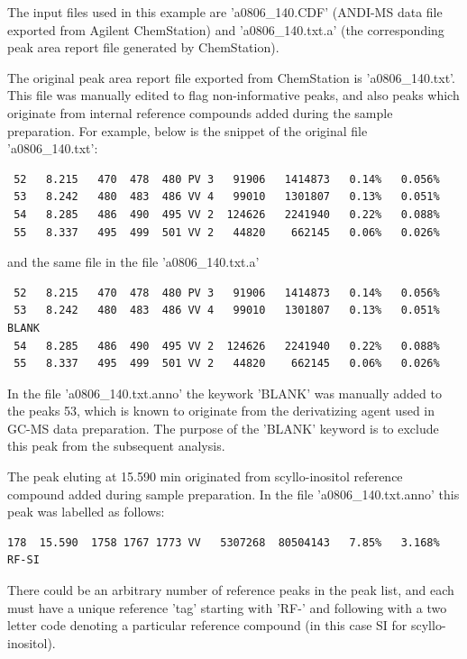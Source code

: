 The input files used in this example are 'a0806\_140.CDF' (ANDI-MS data
file exported from Agilent ChemStation) and 'a0806\_140.txt.a' (the 
corresponding peak area report file generated by ChemStation).

The original peak area report file exported from ChemStation is
'a0806\_140.txt'. This file was manually edited to flag non-informative
peaks, and also peaks which originate from internal reference compounds
added during the sample preparation. For example, below is the snippet
of the original file 'a0806\_140.txt':

\begin{verbatim}
 52   8.215   470  478  480 PV 3   91906   1414873   0.14%   0.056%
 53   8.242   480  483  486 VV 4   99010   1301807   0.13%   0.051%
 54   8.285   486  490  495 VV 2  124626   2241940   0.22%   0.088%
 55   8.337   495  499  501 VV 2   44820    662145   0.06%   0.026%
\end{verbatim}

\noindent
and the same file in the file 'a0806\_140.txt.a'

\begin{verbatim}
 52   8.215   470  478  480 PV 3   91906   1414873   0.14%   0.056%
 53   8.242   480  483  486 VV 4   99010   1301807   0.13%   0.051% BLANK
 54   8.285   486  490  495 VV 2  124626   2241940   0.22%   0.088%
 55   8.337   495  499  501 VV 2   44820    662145   0.06%   0.026%
\end{verbatim}

\noindent
In the file 'a0806\_140.txt.anno' the keywork 'BLANK' was manually added to
the peaks 53, which is known to originate from the derivatizing agent used
in GC-MS data preparation.  The purpose of the 'BLANK' keyword is to
exclude this peak from the subsequent analysis.

The peak eluting at 15.590 min originated from scyllo-inositol reference
compound added during sample preparation. In the file 'a0806\_140.txt.anno'
this peak was labelled as follows:

\begin{verbatim}
178  15.590  1758 1767 1773 VV   5307268  80504143   7.85%   3.168% RF-SI
\end{verbatim}

\noindent
There could be an arbitrary number of reference peaks in the peak list, and each
must have a unique reference 'tag' starting with 'RF-' and following with a two
letter code denoting a particular reference compound (in this case SI for
scyllo-inositol).

